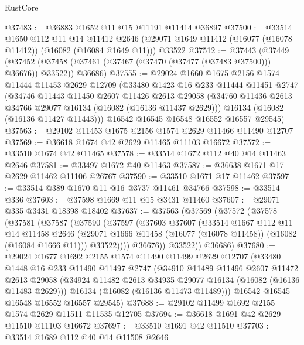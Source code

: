 \begin{lexlean}{RustCore}
\begin{coremodule}
@37483 := @36883 @1652 @11 @15 @11191 @11414 @36897
@37500 := @33514
    @1650
    @112
    @11
    @14
    @11412
    @2646
    (@29071 @1649 @11412 (@16077 (@16078 @11412)) (@16082 (@16084 @1649 @11)))
    @33522
@37512 := @37443
    (@37449
      (@37452 (@37458 (@37461 (@37467 (@37470 (@37477 (@37483 @37500))) @36676)) @33522))
      @36686)
@37555 := @29024
    @1660
    @1675
    @2156
    @1574
    @11444
    @11453
    @2629
    @12709
    (@33480
      @1423
      @16
      @233
      @11444
      @11451
      @2747
      (@34746
        @11443
        @11450
        @2607
        @11426
        @2613
        @29058
        (@34760 @11436 @2613 @34766 @29077 @16134 (@16082 (@16136 @11437 @2629)))
        @16134
        (@16082 (@16136 @11427 @11443)))
      @16542
      @16545
      @16548
      @16552
      @16557
      @29545)
@37563 := @29102 @11453 @1675 @2156 @1574 @2629 @11466 @11490 @12707
@37569 := @36618 @1674 @42 @2629 @11465 @11103 @16672
@37572 := @33510 @1674 @42 @11465
@37578 := @33514 @1672 @112 @40 @14 @11463 @2646
@37581 := @33497 @1672 @40 @11463
@37587 := @36638 @1671 @17 @2629 @11462 @11106 @26767
@37590 := @33510 @1671 @17 @11462
@37597 := @33514 @389 @1670 @11 @16 @3737 @11461 @34766
@37598 := @33514 @336
@37603 := @37598 @1669 @11 @15 @3431 @11460
@37607 := @29071 @335 @3431 @18398 @18402
@37637 := @37563
    (@37569
      (@37572
        (@37578
          (@37581
            (@37587
              (@37590
                (@37597
                  (@37603
                    @37607
                    (@33514
                      @1667
                      @112
                      @11
                      @14
                      @11458
                      @2646
                      (@29071 @1666 @11458 (@16077 (@16078 @11458)) (@16082 (@16084 @1666 @11)))
                      @33522))))
              @36676))
          @33522))
      @36686)
@37680 := @29024
    @1677
    @1692
    @2155
    @1574
    @11490
    @11499
    @2629
    @12707
    (@33480
      @1448
      @16
      @233
      @11490
      @11497
      @2747
      (@34910
        @11489
        @11496
        @2607
        @11472
        @2613
        @29058
        (@34924 @11482 @2613 @34935 @29077 @16134 (@16082 (@16136 @11483 @2629)))
        @16134
        (@16082 (@16136 @11473 @11489)))
      @16542
      @16545
      @16548
      @16552
      @16557
      @29545)
@37688 := @29102 @11499 @1692 @2155 @1574 @2629 @11511 @11535 @12705
@37694 := @36618 @1691 @42 @2629 @11510 @11103 @16672
@37697 := @33510 @1691 @42 @11510
@37703 := @33514 @1689 @112 @40 @14 @11508 @2646

\end{coremodule}
\end{lexlean}
